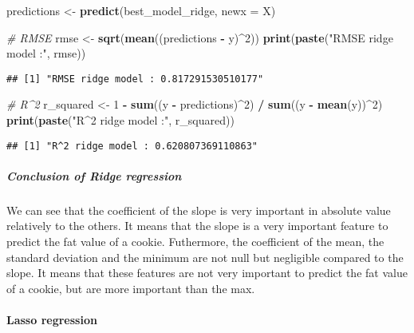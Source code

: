 \documentclass[
]{article}
\newenvironment{Shaded}{\begin{snugshade}}{\end{snugshade}}
\newcommand{\AttributeTok}[1]{\textcolor[rgb]{0.13,0.29,0.53}{#1}}
\newcommand{\CommentTok}[1]{\textcolor[rgb]{0.56,0.35,0.01}{\textit{#1}}}
\newcommand{\DecValTok}[1]{\textcolor[rgb]{0.00,0.00,0.81}{#1}}
\newcommand{\FunctionTok}[1]{\textcolor[rgb]{0.13,0.29,0.53}{\textbf{#1}}}
\newcommand{\NormalTok}[1]{#1}
\newcommand{\OtherTok}[1]{\textcolor[rgb]{0.56,0.35,0.01}{#1}}
\newcommand{\SpecialCharTok}[1]{\textcolor[rgb]{0.81,0.36,0.00}{\textbf{#1}}}
\newcommand{\StringTok}[1]{\textcolor[rgb]{0.31,0.60,0.02}{#1}}
\begin{document}
\begin{Shaded}
\begin{Highlighting}[]
\NormalTok{predictions }\OtherTok{\textless{}{-}} \FunctionTok{predict}\NormalTok{(best\_model\_ridge, }\AttributeTok{newx =}\NormalTok{ X)}

\CommentTok{\# RMSE}
\NormalTok{rmse }\OtherTok{\textless{}{-}} \FunctionTok{sqrt}\NormalTok{(}\FunctionTok{mean}\NormalTok{((predictions }\SpecialCharTok{{-}}\NormalTok{ y)}\SpecialCharTok{\^{}}\DecValTok{2}\NormalTok{)) }
\FunctionTok{print}\NormalTok{(}\FunctionTok{paste}\NormalTok{(}\StringTok{"RMSE ridge model :"}\NormalTok{, rmse))}
\end{Highlighting}
\end{Shaded}

\begin{verbatim}
## [1] "RMSE ridge model : 0.817291530510177"
\end{verbatim}

\begin{Shaded}
\begin{Highlighting}[]
\CommentTok{\# R\^{}2}
\NormalTok{r\_squared }\OtherTok{\textless{}{-}} \DecValTok{1} \SpecialCharTok{{-}} \FunctionTok{sum}\NormalTok{((y }\SpecialCharTok{{-}}\NormalTok{ predictions)}\SpecialCharTok{\^{}}\DecValTok{2}\NormalTok{) }\SpecialCharTok{/} \FunctionTok{sum}\NormalTok{((y }\SpecialCharTok{{-}} \FunctionTok{mean}\NormalTok{(y))}\SpecialCharTok{\^{}}\DecValTok{2}\NormalTok{)}
\FunctionTok{print}\NormalTok{(}\FunctionTok{paste}\NormalTok{(}\StringTok{"R\^{}2 ridge model :"}\NormalTok{, r\_squared))}
\end{Highlighting}
\end{Shaded}

\begin{verbatim}
## [1] "R^2 ridge model : 0.620807369110863"
\end{verbatim}

\subparagraph{Conclusion of Ridge
regression}\label{conclusion-of-ridge-regression}

We can see that the coefficient of the slope is very important in
absolute value relatively to the others. It means that the slope is a
very important feature to predict the fat value of a cookie. Futhermore,
the coefficient of the mean, the standard deviation and the minimum are
not null but negligible compared to the slope. It means that these
features are not very important to predict the fat value of a cookie,
but are more important than the max.

\paragraph{Lasso regression}\label{lasso-regression}
\end{document}

